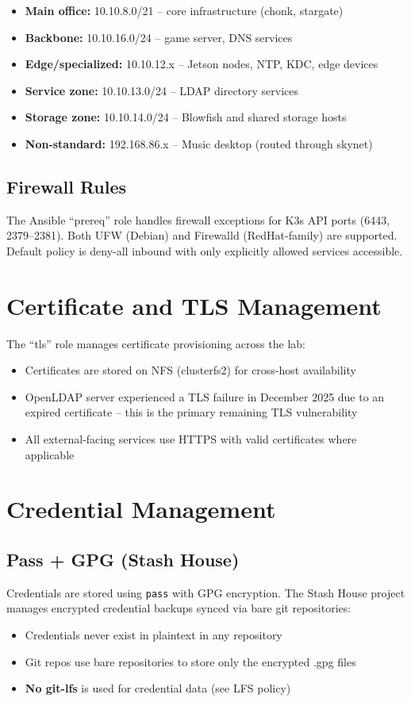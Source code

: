 \begin{itemize}
  \item \textbf{Main office:} 10.10.8.0/21 -- core infrastructure (chonk, stargate)
  \item \textbf{Backbone:} 10.10.16.0/24 -- game server, DNS services
  \item \textbf{Edge/specialized:} 10.10.12.x -- Jetson nodes, NTP, KDC, edge devices
  \item \textbf{Service zone:} 10.10.13.0/24 -- LDAP directory services
  \item \textbf{Storage zone:} 10.10.14.0/24 -- Blowfish and shared storage hosts
  \item \textbf{Non-standard:} 192.168.86.x -- Music desktop (routed through skynet)
\end{itemize}

\subsection{Firewall Rules}
The Ansible ``prereq'' role handles firewall exceptions for K3s API ports (6443, 2379--2381). Both UFW (Debian) and Firewalld (RedHat-family) are supported. Default policy is deny-all inbound with only explicitly allowed services accessible.

\section{Certificate and TLS Management}
The ``tls'' role manages certificate provisioning across the lab:
\begin{itemize}
  \item Certificates are stored on NFS (clusterfs2) for cross-host availability
  \item OpenLDAP server experienced a TLS failure in December 2025 due to an expired certificate -- this is the primary remaining TLS vulnerability
  \item All external-facing services use HTTPS with valid certificates where applicable
\end{itemize}

\section{Credential Management}

\subsection{Pass + GPG (Stash House)}
Credentials are stored using \texttt{pass} with GPG encryption. The Stash House project manages encrypted credential backups synced via bare git repositories:
\begin{itemize}
  \item Credentials never exist in plaintext in any repository
  \item Git repos use bare repositories to store only the encrypted .gpg files
  \item \textbf{No git-lfs} is used for credential data (see LFS policy)
\end{itemize}

